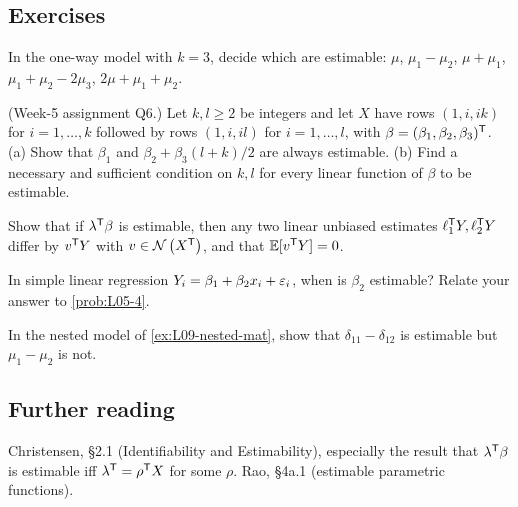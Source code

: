 \subsection{Exercises}
\begin{problem}\label{prob:L10-1}
In the one-way model with $k=3$, decide which are estimable: $\mu$, $\mu_1-\mu_2$, $\mu+\mu_1$, $\mu_1+\mu_2-2\mu_3$, $2\mu+\mu_1+\mu_2$.
\end{problem}
\begin{problem}\label{prob:L10-2}
(Week-5 assignment Q6.) Let $k,l\ge 2$ be integers and let $X$ have rows $(1,i,ik)$ for $i=1,\dots,k$ followed by rows $(1,i,il)$ for $i=1,\dots,l$, with $\beta=(\beta_1,\beta_2,\beta_3)^{\mathsf T}$.
(a) Show that $\beta_1$ and $\beta_2+\beta_3(l+k)/2$ are always estimable.
(b) Find a necessary and sufficient condition on $k,l$ for every linear function of $\beta$ to be estimable.
\end{problem}
\begin{problem}\label{prob:L10-3}
Show that if $\lambda^{\mathsf T}\beta$ is estimable, then any two linear unbiased estimates $\ell_1^{\mathsf T} Y,\ell_2^{\mathsf T} Y$ differ by $v^{\mathsf T} Y$ with $v\in\mathcal{N}\left(X^{\mathsf T}\right)$, and that $\mathbb E[v^{\mathsf T} Y]=0$.
\end{problem}
\begin{problem}\label{prob:L10-4}
In simple linear regression $Y_i=\beta_1+\beta_2x_i+\varepsilon_i$, when is $\beta_2$ estimable? Relate your answer to \cref{prob:L05-4}.
\end{problem}
\begin{problem}\label{prob:L10-5}
In the nested model of \cref{ex:L09-nested-mat}, show that $\delta_{11}-\delta_{12}$ is estimable but $\mu_1-\mu_2$ is not.
\end{problem}

\subsection{Further reading}
Christensen, \S2.1 (Identifiability and Estimability), especially the result that $\lambda^{\mathsf T}\beta$
is estimable iff $\lambda^{\mathsf T}=\rho^{\mathsf T} X$ for some $\rho$. Rao, \S4a.1 (estimable parametric functions).
